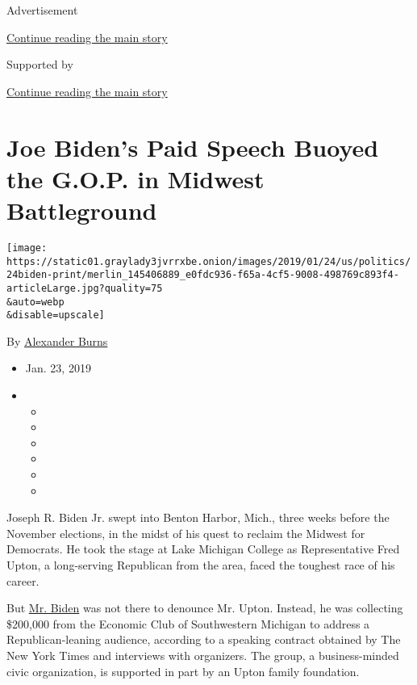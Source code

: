 Advertisement

\protect\hyperlink{after-top}{Continue reading the main story}

Supported by

\protect\hyperlink{after-sponsor}{Continue reading the main story}

\hypertarget{joe-bidens-paid-speech-buoyed-the-gop-in-midwest-battleground}{%
\section{Joe Biden's Paid Speech Buoyed the G.O.P. in Midwest
Battleground}\label{joe-bidens-paid-speech-buoyed-the-gop-in-midwest-battleground}}

\texttt{[image: https://static01.graylady3jvrrxbe.onion/images/2019/01/24/us/politics/24biden-print/merlin\_145406889\_e0fdc936-f65a-4cf5-9008-498769c893f4-articleLarge.jpg?quality=75\\\&auto=webp\\\&disable=upscale]}

By
\href{https://www.nytimes3xbfgragh.onion/by/alexander-burns}{Alexander
Burns}

\begin{itemize}
\item
  Jan. 23, 2019
\item
  \begin{itemize}
  \item
  \item
  \item
  \item
  \item
  \item
  \end{itemize}
\end{itemize}

Joseph R. Biden Jr. swept into Benton Harbor, Mich., three weeks before
the November elections, in the midst of his quest to reclaim the Midwest
for Democrats. He took the stage at Lake Michigan College as
Representative Fred Upton, a long-serving Republican from the area,
faced the toughest race of his career.

But
\href{https://www.nytimes3xbfgragh.onion/2020/05/06/us/politics/obama-letter-biden-GOP-investigation.html}{Mr.
Biden} was not there to denounce Mr. Upton. Instead, he was collecting
\$200,000 from the Economic Club of Southwestern Michigan to address a
Republican-leaning audience, according to a speaking contract obtained
by The New York Times and interviews with organizers. The group, a
business-minded civic organization, is supported in part by an Upton
family foundation.

